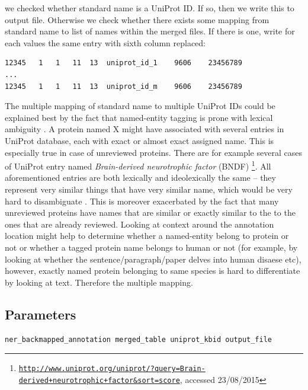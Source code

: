 we checked whether standard name is a UniProt ID. If so, then we write this to output file. Otherwise we check whether there exists some mapping from standard name to list of names within the merged files. If there is one, write for each values the same entry with sixth column replaced:

\begin{lstlisting}[breaklines]
12345	1	1	11	13	uniprot_id_1	9606	23456789
...
12345	1	1	11	13	uniprot_id_m	9606	23456789
\end{lstlisting}


The multiple mapping of standard name to multiple UniProt IDs could be explained best by the fact that named-entity tagging is prone with lexical ambiguity \citep{ratinov2009design}. A protein named X might have associated with several entries in UniProt database, each with exact or almost exact assigned name. This is especially true in case of unreviewed proteins. There are for example several cases of UniProt entry named \textit{Brain-derived neurotrophic factor} (BNDF) \footnote{\href{http://www.uniprot.org/uniprot/?query=Brain-derived+neurotrophic+factor&sort=score}{\texttt{http://www.uniprot.org/uniprot/?query=Brain-derived+neurotrophic+factor\&sort=score}}, accessed 23/08/2015}. All aforementioned entries are both lexically and ideolexically the same -- they represent very similar things that have very similar name, which would be very hard to disambiguate \citep{ratinov2009design}. This is moreover exacerbated by the fact that many unreviewed proteins have names that are similar or exactly similar to the to the ones that are already reviewed. Looking at context around the annotation location might help to determine whether a named-entity belong to protein or not or whether a tagged protein name belongs to human or not (for example, by looking at whether the sentence/paragraph/paper delves into human disaese etc), however, exactly named protein belonging to same species is hard to differentiate by looking at text. Therefore the multiple mapping.

\subsection{Parameters}

\begin{lstlisting}[breaklines]
ner_backmapped_annotation merged_table uniprot_kbid output_file
\end{lstlisting}

